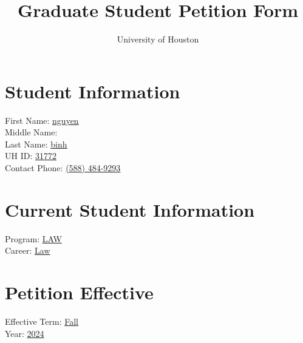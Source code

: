 \documentclass[a4paper,12pt]{article}
\title{Graduate Student Petition Form}
\author{University of Houston}
\date{}
\begin{document}
\maketitle

\section*{Student Information}
\begin{tabbing}
First Name: \hspace{3cm} \= \underline{\hspace{5cm} nguyen} \\
Middle Name: \> \underline{\hspace{5cm} } \\
Last Name: \> \underline{\hspace{5cm}  binh} \\
UH ID: \> \underline{\hspace{5cm} 31772} \\
Contact Phone: \> \underline{\hspace{5cm} (588) 484-9293} \\
\end{tabbing}

\section*{Current Student Information}
\begin{tabbing}
Program: \hspace{3cm} \= \underline{\hspace{5cm} LAW} \\
Career: \> \underline{\hspace{5cm} Law} \\
\end{tabbing}

\section*{Petition Effective}
\begin{tabbing}
Effective Term: \hspace{2cm} \= \underline{\hspace{5cm} Fall} \\
Year: \> \underline{\hspace{5cm} 2024} \\
\end{tabbing}
\end{document}
